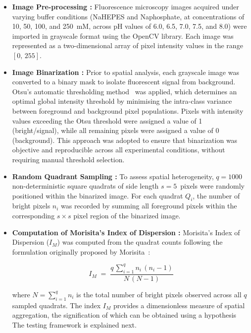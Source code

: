 \begin{itemize}
    \item \textbf{Image Pre-processing :} Fluorescence microscopy images acquired under varying buffer conditions (NaHEPES and Naphosphate, at concentrations of 10, 50, 100, and 250~mM, across
    pH values of 6.0, 6.5, 7.0, 7.5, and 8.0) were imported in grayscale format
    using the OpenCV library.
    Each image was represented as a two-dimensional array of pixel intensity values
    in the range $[0,\,255]$.
    \item \textbf{Image Binarization :} Prior to spatial analysis, each grayscale image was converted to a binary mask to
    isolate fluorescent signal from background. Otsu's automatic thresholding
    method~\cite{otsu1979} was applied, which determines an optimal global
    intensity threshold by minimising the intra-class variance between foreground and
    background pixel populations. Pixels with intensity values exceeding the Otsu
    threshold were assigned a value of 1 (bright/signal), while all remaining pixels
    were assigned a value of 0 (background). This approach was adopted to ensure that
    binarization was objective and reproducible across all experimental conditions,
    without requiring manual threshold selection.

    \item \textbf{Random Quadrant Sampling :} To assess spatial heterogeneity, $q = 1000$ non-deterministic square quadrats of
    side length $s = 5$~pixels were randomly positioned within the binarized image. For each quadrat $Q_i$, the number of bright pixels
    $n_i$ was recorded by summing all foreground pixels within the corresponding
    $s \times s$ pixel region of the binarized image.

    \item \textbf{Computation of Morisita's Index of Dispersion :} Morisita's Index of Dispersion ($I_M$) was computed from the quadrat counts
    following the formulation originally proposed by Morisita~\cite{morisita1959}:
    
    \begin{equation}
        I_M \;=\; \frac{q\,\displaystyle\sum_{i=1}^{q} n_i\,(n_i - 1)}{N\,(N - 1)}
        \label{eq:morisita}
    \end{equation}
    
    \noindent where $N = \sum_{i=1}^{q} n_i$ is the total number of bright pixels
    observed across all $q$ sampled quadrats. The index $I_M$ provides a
    dimensionless measure of spatial aggregation, the 
    signification of which can be obtained using a hypothesis
    The testing framework is explained next. 


\end{itemize}
